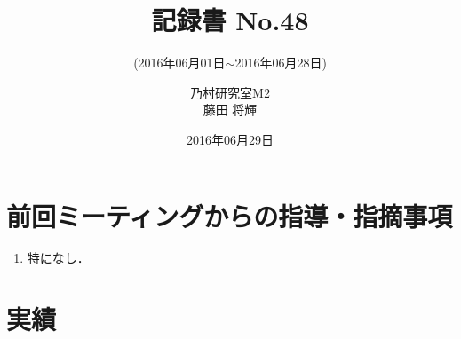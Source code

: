 \documentclass[fleqn, 12pt]{extarticle}
\subtitle{(2016年06月01日$\sim$2016年06月28日)}
\author{乃村研究室M2\\藤田 将輝}
\date{2016年06月29日}
\title{記録書 No.48}
\begin{document}
    \maketitle

    \section{前回ミーティングからの指導・指摘事項}
    \label{sec-1}
    \begin{enumerate}

        \item 特になし．

    \end{enumerate}

    \section{実績}
    \label{sec-2}
\end{document}
